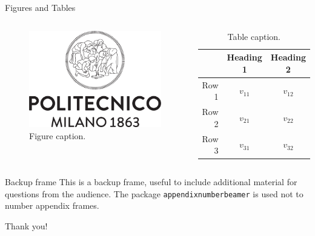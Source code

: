     \begin{frame}{Figures and Tables}
        \begin{columns}
                \begin{figure}
                    \centering
                    \includegraphics[scale=0.15]{../report/images/logo-polimi-transparent}
                    \caption{Figure caption.}
                    \label{fig:focuslogo}
                \end{figure}
                
                \begin{table}
                    \centering
                    \begin{tabular}{rcc}
                         & Heading 1 & Heading 2 \\\hline
                        Row 1 & \(v_{11}\) & \(v_{12}\) \\
                        Row 2 & \(v_{21}\) & \(v_{22}\) \\
                        Row 3 & \(v_{31}\) & \(v_{32}\) \\
                    \end{tabular}
                    \caption{Table caption.}
                    \label{tab:demo}
                \end{table}
        \end{columns}
    \end{frame}

    
    \begin{frame}{Backup frame}
        This is a backup frame, useful to include additional material for questions from the audience.
        \vfill
        The package \texttt{appendixnumberbeamer} is used not to number appendix frames.
    \end{frame}

\begin{frame}
    Thank you!
\end{frame}